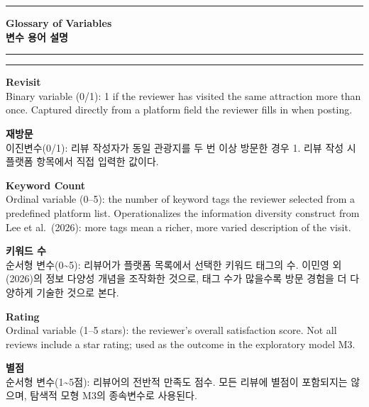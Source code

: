\documentclass[10pt,a4paper]{article}
\begin{document}
\vspace{4pt}
\noindent\rule{\linewidth}{0.8pt}


\clearpage

\begin{center}
  {\large\bfseries Glossary of Variables}\\[2pt]
  {\large\bfseries 변수 용어 설명}
\end{center}
\rule{\linewidth}{0.8pt}\vspace{4pt}

\newcommand{\gterm}[4]{%
  \noindent%
  \begin{minipage}[t]{0.485\linewidth}
    \small\textbf{#1}\\[2pt] #2
  \end{minipage}\hfill\vrule\hfill%
  \begin{minipage}[t]{0.483\linewidth}
    \small\textbf{#3}\\[2pt] #4
  \end{minipage}\par\vspace{8pt}%
}

\par
\vspace{2pt}\rule{\linewidth}{0.3pt}\vspace{4pt}

\gterm{Revisit}{%
Binary variable (0/1): 1 if the reviewer has visited the same attraction more than once. Captured directly from a platform field the reviewer fills in when posting.
}{재방문}{%
이진변수(0/1): 리뷰 작성자가 동일 관광지를 두 번 이상 방문한 경우 1. 리뷰 작성 시 플랫폼 항목에서 직접 입력한 값이다.
}

\gterm{Keyword Count}{%
Ordinal variable (0--5): the number of keyword tags the reviewer selected from a predefined platform list. Operationalizes the information diversity construct from Lee et al.\ (2026): more tags mean a richer, more varied description of the visit.
}{키워드 수}{%
순서형 변수(0\textasciitilde5): 리뷰어가 플랫폼 목록에서 선택한 키워드 태그의 수. 이민영 외(2026)의 정보 다양성 개념을 조작화한 것으로, 태그 수가 많을수록 방문 경험을 더 다양하게 기술한 것으로 본다.
}

\gterm{Rating}{%
Ordinal variable (1--5 stars): the reviewer's overall satisfaction score. Not all reviews include a star rating; used as the outcome in the exploratory model M3.
}{별점}{%
순서형 변수(1\textasciitilde5점): 리뷰어의 전반적 만족도 점수. 모든 리뷰에 별점이 포함되지는 않으며, 탐색적 모형 M3의 종속변수로 사용된다.
}
\end{document}
